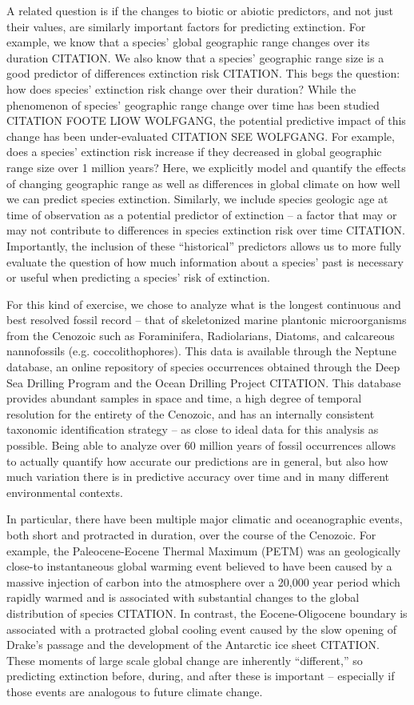 \documentclass[12pt,letterpaper]{article}
\begin{document}
A related question is if the changes to biotic or abiotic predictors, and not just their values, are similarly important factors for predicting extinction. For example, we know that a species' global geographic range changes over its duration CITATION. We also know that a species' geographic range size is a good predictor of differences extinction risk CITATION. This begs the question: how does species' extinction risk change over their duration? While the phenomenon of species' geographic range change over time has been studied CITATION FOOTE LIOW WOLFGANG, the potential predictive impact of this change has been under-evaluated CITATION SEE WOLFGANG. For example, does a species' extinction risk increase if they decreased in global geographic range size over 1 million years? Here, we explicitly model and quantify the effects of changing geographic range as well as differences in global climate on how well we can predict species extinction. Similarly, we include species geologic age at time of observation as a potential predictor of extinction -- a factor that may or may not contribute to differences in species extinction risk over time CITATION. Importantly, the inclusion of these ``historical'' predictors allows us to more fully evaluate the question of how much information about a species' past is necessary or useful when predicting a species' risk of extinction.

For this kind of exercise, we chose to analyze what is the longest continuous and best resolved fossil record -- that of skeletonized marine plantonic microorganisms from the Cenozoic such as Foraminifera, Radiolarians, Diatoms, and calcareous nannofossils (e.g. coccolithophores). This data is available through the Neptune database, an online repository of species occurrences obtained through the Deep Sea Drilling Program and the Ocean Drilling Project CITATION. This database provides abundant samples in space and time, a high degree of temporal resolution for the entirety of the Cenozoic, and has an internally consistent taxonomic identification strategy -- as close to ideal data for this analysis as possible. Being able to analyze over 60 million years of fossil occurrences allows to actually quantify how accurate our predictions are in general, but also how much variation there is in predictive accuracy over time and in many different environmental contexts.

In particular, there have been multiple major climatic and oceanographic events, both short and protracted in duration, over the course of the Cenozoic. For example, the Paleocene-Eocene Thermal Maximum (PETM) was an geologically close-to instantaneous global warming event believed to have been caused by a massive injection of carbon into the atmosphere over a 20,000 year period which rapidly warmed and is associated with substantial changes to the global distribution of species CITATION. In contrast, the Eocene-Oligocene boundary is associated with a protracted global cooling event caused by the slow opening of Drake's passage and the development of the Antarctic ice sheet CITATION. These moments of large scale global change are inherently ``different,'' so predicting extinction before, during, and after these is important -- especially if those events are analogous to future climate change.
\end{document}
